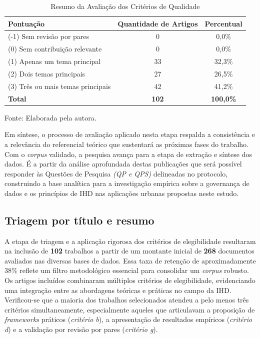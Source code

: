 \documentclass[
	12pt,				%
	oneside,			%
	a4paper,			%
	english,			%
	brazil				%
	]{abntex2ppgsi}
\begin{document}
\begin{table}[htpb]
    \centering
    \caption{Resumo da Avaliação dos Critérios de Qualidade}
    \label{tab:resumo_qualidade}
    \begin{tabular}{lcc}
        \toprule
        \textbf{Pontuação} & \textbf{Quantidade de Artigos} & \textbf{Percentual} \\
        \midrule
        (-1) Sem revisão por pares & 0 & 0,0\% \\
        (0) Sem contribuição relevante & 0 & 0,0\% \\
        (1) Apenas um tema principal & 33 & 32,3\% \\
        (2) Dois temas principais & 27 & 26,5\% \\
        (3) Três ou mais temas principais & 42 & 41,2\% \\
        \midrule
        \textbf{Total} & \textbf{102} & \textbf{100,0\%} \\
        \bottomrule
    \end{tabular}
    
    \vspace{0.2cm}
    \small{Fonte: Elaborada pela autora.}
\end{table}

    Em síntese, o processo de avaliação aplicado nesta etapa respalda a consistência e a relevância do referencial teórico que sustentará as próximas fases do trabalho. Com o \textit{corpus} validado, a pesquisa avança para a etapa de extração e síntese dos dados. É a partir da análise aprofundada destas publicações que será possível responder às Questões de Pesquisa \textit{(QP e QPS)} delineadas no protocolo, construindo a base analítica para a investigação empírica sobre a governança de dados e os princípios de IHD nas aplicações urbanas propostas neste estudo.
    
 \subsection{Triagem por título e resumo}

A etapa de triagem e a aplicação rigorosa dos critérios de elegibilidade resultaram na inclusão de \textbf{102} trabalhos a partir de um montante inicial de \textbf{268} documentos avaliados nas diversas bases de dados. Essa taxa de retenção de aproximadamente 38\% reflete um filtro metodológico essencial para consolidar um \textit{corpus} robusto. Os artigos incluídos combinaram múltiplos critérios de elegibilidade, evidenciando uma integração entre as abordagens teóricas e práticas no campo da IHD. Verificou-se que a maioria dos trabalhos selecionados atendeu a pelo menos três critérios simultaneamente, especialmente aqueles que articulavam a proposição de \textit{frameworks} práticos (\textit{critério b}), a apresentação de resultados empíricos (\textit{critério d}) e a validação por revisão por pares (\textit{critério g}).
\end{document}
